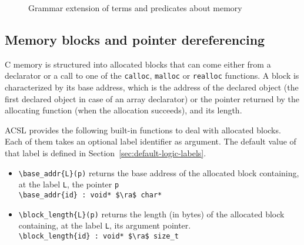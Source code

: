 \begin{figure}[htp]
  \begin{cadre}
      
    \end{cadre}
  \caption{Grammar extension of terms and predicates about memory}
\label{fig:gram:memory}
\end{figure}



\subsection{Memory blocks and pointer dereferencing}
\label{subsec:memory}
C memory is structured into allocated blocks that can come either from a
declarator or a call to one of the \lstinline|calloc|, \lstinline|malloc| or
\lstinline|realloc| functions. A block is characterized by its base address,
which is the address of the declared object (the first declared object
in case of an array declarator) or the pointer returned by the allocating
function (when the allocation succeeds), and its length.

ACSL provides the following built-in functions to deal with allocated blocks.
Each of them takes an optional label identifier as argument.
The default value of that label is defined in Section~\ref{sec:default-logic-labels}.
\begin{itemize}
\item \lstinline|\base_addr{L}(p)|
returns the base address of the allocated block
containing, at the label \lstinline|L|, the pointer \lstinline|p|
\\ \makebox[5mm]{} \lstinline|\base_addr{id} : void* $\ra$ char*|

\item \lstinline|\block_length{L}(p)|
  returns the length (in bytes) of the allocated block containing,
  at the label \lstinline|L|, its argument pointer.
\\ \makebox[5mm]{} \lstinline|\block_length{id} : void* $\ra$ size_t|

\end{itemize}


